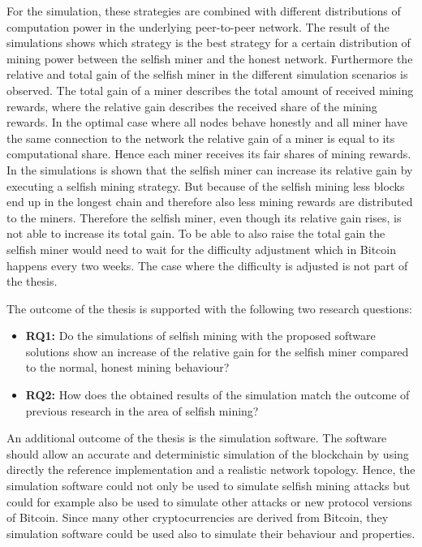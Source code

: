 For the simulation, these strategies are combined with different distributions of computation power in the underlying peer-to-peer network.
The result of the simulations shows which strategy is the best strategy for a certain distribution of mining power between the selfish miner and the honest network.
Furthermore the relative and total gain of the selfish miner in the different simulation scenarios is observed.
The total gain of a miner describes the total amount of received mining rewards, where the relative gain describes the received share of the mining rewards.
In the optimal case where all nodes behave honestly and      all miner have the same connection to the network the relative gain of a miner is equal to its computational share.
Hence each miner receives its fair shares of mining rewards.
In the simulations is shown that the selfish miner can increase its relative gain by executing a selfish mining strategy.
But because of the selfish mining less blocks end up in the longest chain and therefore also less mining rewards are distributed to the miners.
Therefore the selfish miner, even though its relative gain rises, is not able to increase its total gain.
To be able to also raise the total gain the selfish miner would need to wait for the difficulty adjustment which in Bitcoin happens every two weeks.
The case where the difficulty is adjusted is not part of the thesis.

The outcome of the thesis is supported with the following two research questions:

\begin{itemize}
	\item \textbf{RQ1:} Do the simulations of selfish mining with the proposed software solutions show an increase of the relative gain for the selfish miner compared to the normal, honest mining behaviour?

	\item \textbf{RQ2:} How does the obtained results of the simulation match the outcome of previous research in the area of selfish mining?
\end{itemize}


An additional outcome of the thesis is the simulation software.
The software should allow an accurate and deterministic simulation of the blockchain by using directly the reference implementation and a realistic network topology.
Hence, the simulation software could not only be used to simulate selfish mining attacks but could for example also be used to simulate other attacks or new protocol versions of Bitcoin. 
Since many other cryptocurrencies are derived from Bitcoin, they simulation software could be used also to simulate their behaviour and properties.

